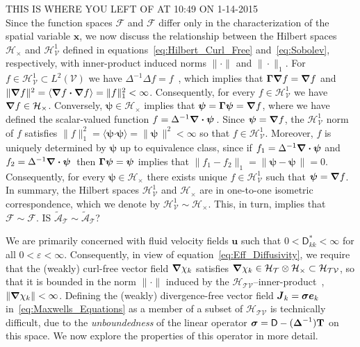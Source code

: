 \documentclass[leqno,onefignum,onetabnum]{siamltex1213}
\newcommand{\Tb}{\mathbf{T}}
\newcommand{\Tc}{\mathcal{T}}
\newcommand{\Vc}{\mathcal{V}}
\newcommand{\Hc}{\mathcal{H}}
\newcommand{\Fc}{\mathcal{F}}
\newcommand{\Ac}{\mathcal{A}}
\newcommand{\Dm}{\mathsf{D}}
\newcommand{\Hs}{\mathscr{H}}
\newcommand{\As}{\mathscr{A}}
\newcommand{\Fs}{\mathscr{F}}
\newcommand\bsig{\mbox{\boldmath${\sigma}$}}
\newcommand\bDelta{\mbox{\boldmath${\Delta}$}}
\newcommand\bGamma{\mbox{\boldmath${\Gamma}$}}
\newcommand\bnabla{\mbox{\boldmath${\nabla}$}}
\providecommand\bcdot{\boldsymbol{\cdot}}
\newcommand{\vecJ}{\boldsymbol{J}}
\newcommand{\vecx}{\boldsymbol{x}}
\newcommand{\vecu}{\boldsymbol{u}}
\newcommand{\vece}{\boldsymbol{e}}
\newcommand{\vecpsi}{\boldsymbol{\psi}}
\begin{document}
THIS IS WHERE YOU LEFT OF AT 10:49 ON 1-14-2015\\
Since the function spaces $\Fs$ and $\Fc$ differ
only in the characterization of the spatial variable $\vecx$, we now
discuss the relationship between the Hilbert spaces $\Hc_\times$ and
$\Hs^1_{\Vc}$ defined in equations~\eqref{eq:Hilbert_Curl_Free}
and~\eqref{eq:Sobolev}, respectively, with inner-product induced norms 
$\|\cdot\|$ and $\|\cdot\|_1$. For $f\in\Hs^1_{\Vc}\subset L^2(\Vc)$ we have 
$\Delta^{-1}\Delta f=f$~\cite{Stakgold:BVP:2000}, which implies that
$\bGamma\bnabla f=\bnabla f$ and
$\|\bnabla f\|^2=\langle\bnabla f\bcdot\bnabla f\rangle=\|f\|_1^2<\infty$. Consequently, for every  
$f\in\Hs^1_{\Vc}$ we have $\bnabla f\in\Hc_\times$. Conversely,
$\vecpsi\in\Hc_\times$ implies that $\vecpsi=\bGamma\vecpsi=\bnabla f$, where
we have defined the scalar-valued function
$f=\Delta^{-1}\bnabla \bcdot\vecpsi\,$. Since $\vecpsi=\bnabla f$, the
$\Hs^1_{\Vc}$ norm of $f$ satisfies
$\|f\|_1^2=\langle\vecpsi\bcdot\vecpsi\rangle=\|\vecpsi\,\|^2<\infty$ so that
$f\in\Hs^1_{\Vc}$. Moreover, $f$ is uniquely determined by $\vecpsi$ up
to equivalence class, since if $f_1=\Delta^{-1}\bnabla \bcdot\vecpsi$ and
$f_2=\Delta^{-1}\bnabla \bcdot\vecpsi\,$ then $\bGamma\vecpsi=\vecpsi$ implies
that $\|f_1-f_2\|_1=\|\vecpsi-\vecpsi\,\|=0$. Consequently, for every  
$\vecpsi\in\Hc_\times$ there exists unique $f\in\Hs^1_{\Vc}$ such that
$\vecpsi=\bnabla f$.  In summary, the Hilbert spaces $\Hs^1_{\Vc}$ and
$\Hc_\times$ are in one-to-one isometric correspondence, which we denote by
$\Hs^1_{\Vc}\sim\Hc_\times$. This, in turn, implies that $\Fs\sim\Fc$.  IS
$\tilde{\As}_{\Tc}\sim\tilde{\Ac}_{\Tc}$? 




\newpage
We are primarily concerned with fluid velocity fields $\vecu $ such
that $0<\Dm^*_{kk}<\infty$ for all $0<\varepsilon<\infty$. Consequently, in view of
equation~\eqref{eq:Eff_Diffusivity}, we require that the (weakly)
curl-free vector field $\bnabla \chi_k$ satisfies
$\bnabla \chi_k\in\Hc_{\Tc}\otimes\Hc_\times\subset\Hc_{\Tc\Vc}$, so that it is
bounded in the norm $\|\cdot\|$ induced by the
$\Hc_{\Tc\Vc}$--inner-product~\cite{Folland:99:RealAnalysis}, $\|\bnabla
\chi_k\|<\infty$. Defining the (weakly) 
divergence-free vector field $\vecJ_k=\bsig\vece _k$
in~\eqref{eq:Maxwells_Equations} as a member of a subset of 
$\Hc_{\Tc\Vc}$ is technically difficult, due to the
\emph{unboundedness} of the linear operator
$\bsig=\Dm-(\bDelta^{-1})\Tb$ on this space. We now explore the
properties of this operator in more detail.  
\end{document}
